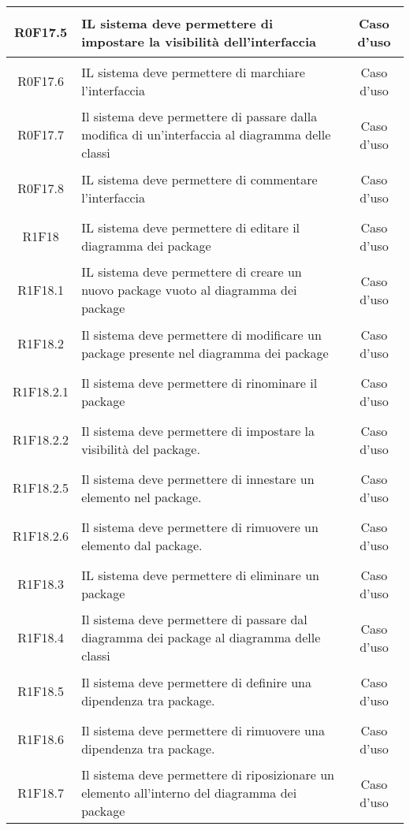 \documentclass[../AnalisiDeiRequisiti.tex]{subfiles}
\begin{document}
\begin{longtable}{|c|>{\centering}p{7cm}|c|}
	\hypertarget{R0F17.5}{R0F17.5} & IL sistema deve permettere di impostare la visibilità dell'interfaccia & Caso d'uso \\ \hline
	\hypertarget{R0F17.6}{R0F17.6} & IL sistema deve permettere di marchiare l'interfaccia & Caso d'uso \\ \hline
	\hypertarget{R0F17.7}{R0F17.7} & Il sistema deve permettere di passare dalla modifica di un'interfaccia al diagramma delle classi & Caso d'uso \\ \hline
	\hypertarget{R0F17.8}{R0F17.8} & IL sistema deve permettere di commentare l'interfaccia & Caso d'uso \\ \hline
	\hypertarget{R1F18}{R1F18} & IL sistema deve permettere di editare il diagramma dei package & Caso d'uso \\ \hline
	\hypertarget{R1F18.1}{R1F18.1} & IL sistema deve permettere di creare un nuovo package vuoto al diagramma dei package & Caso d'uso \\ \hline
	\hypertarget{R1F18.2}{R1F18.2} & Il sistema deve permettere di modificare un package presente nel diagramma dei package & Caso d'uso \\ \hline
	\hypertarget{R1F18.2.1}{R1F18.2.1} & Il sistema deve permettere di rinominare il package & Caso d'uso \\ \hline
	\hypertarget{R1F18.2.2}{R1F18.2.2} & Il sistema deve permettere di impostare la visibilità del package. & Caso d'uso \\ \hline
	\hypertarget{R1F18.2.3}{R1F18.2.5} & Il sistema deve permettere di innestare un elemento nel package. & Caso d'uso \\ \hline
	\hypertarget{R1F18.2.4}{R1F18.2.6} & Il sistema deve permettere di rimuovere un elemento dal package. & Caso d'uso \\ \hline
	\hypertarget{R1F18.3}{R1F18.3} & IL sistema deve permettere di eliminare un package & Caso d'uso \\ \hline
	\hypertarget{R1F18.4}{R1F18.4} & Il sistema deve permettere di passare dal diagramma dei package al diagramma delle classi & Caso d'uso \\ \hline
	\hypertarget{R1F18.5}{R1F18.5} & Il sistema deve permettere di definire una dipendenza tra package. & Caso d'uso \\ \hline
	\hypertarget{R1F18.6}{R1F18.6} & Il sistema deve permettere di rimuovere una dipendenza tra package. & Caso d'uso \\ \hline
	\hypertarget{R1F18.7}{R1F18.7} & Il sistema deve permettere di riposizionare un elemento all'interno del diagramma dei package & Caso d'uso \\ \hline

\end{longtable}
\end{document}
